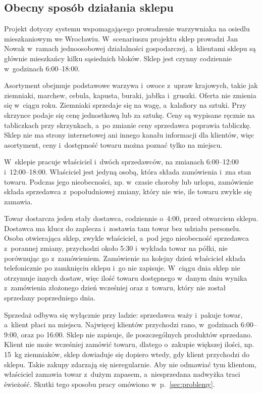 \documentclass[12pt,a4paper,oneside]{article}
\newcounter{pu}
\begin{document}
\subsection{Obecny sposób działania sklepu}
\label{sec:opis}

Projekt dotyczy systemu wspomagającego prowadzenie warzywniaka na osiedlu mieszkaniowym we Wrocławiu. W~scenariuszu projektu sklep prowadzi Jan Nowak w~ramach jednoosobowej działalności gospodarczej, a~klientami sklepu są głównie mieszkańcy kilku sąsiednich bloków. Sklep jest czynny codziennie w~godzinach 6:00--18:00.

Asortyment obejmuje podstawowe warzywa i~owoce z~upraw krajowych, takie jak ziemniaki, marchew, cebula, kapusta, buraki, jabłka i~gruszki. Oferta nie zmienia się w~ciągu roku. Ziemniaki sprzedaje się na wagę, a~kalafiory na sztuki. Przy skrzynce podaje się cenę jednostkową lub za sztukę. Ceny są wypisane ręcznie na tabliczkach przy skrzynkach, a~po zmianie ceny sprzedawca poprawia tabliczkę. Sklep nie ma strony internetowej ani innego kanału informacji dla klientów, więc asortyment, ceny i~dostępność towaru można poznać tylko na miejscu.

W~sklepie pracuje właściciel i~dwóch sprzedawców, na zmianach 6:00--12:00 i~12:00--18:00. Właściciel jest jedyną osobą, która składa zamówienia i~zna stan towaru. Podczas jego nieobecności, np. w~czasie choroby lub urlopu, zamówienie składa sprzedawca z~popołudniowej zmiany, który nie wie, ile towaru zwykle się zamawia.

Towar dostarcza jeden stały dostawca, codziennie o~4:00, przed otwarciem sklepu. Dostawca ma klucz do zaplecza i~zostawia tam towar bez udziału personelu. Osoba otwierająca sklep, zwykle właściciel, a~pod jego nieobecność sprzedawca z~porannej zmiany, przychodzi około 5:30 i~wykłada towar na półki, nie porównując go z~zamówieniem. Zamówienie na kolejny dzień właściciel składa telefonicznie po zamknięciu sklepu i~go nie zapisuje. W~ciągu dnia sklep nie otrzymuje innych dostaw, więc ilość towaru dostępnego w~danym dniu wynika z~zamówienia złożonego dzień wcześniej oraz z~towaru, który nie został sprzedany poprzedniego dnia.

Sprzedaż odbywa się wyłącznie przy ladzie: sprzedawca waży i~pakuje towar, a~klient płaci na miejscu. Najwięcej klientów przychodzi rano, w~godzinach 6:00--9:00, oraz po 16:00. Sklep nie zapisuje, ile poszczególnych produktów sprzedano. Klient nie może wcześniej zamówić towaru, dlatego o~zakupie większej ilości, np. 15~kg ziemniaków, sklep dowiaduje się dopiero wtedy, gdy klient przychodzi do sklepu. Takie zakupy zdarzają się nieregularnie. Aby nie odmawiać tym klientom, właściciel zamawia towar z~dużym zapasem, a~niesprzedana nadwyżka traci świeżość. Skutki tego sposobu pracy omówiono w~p.~\ref{sec:problemy}.
\end{document}
